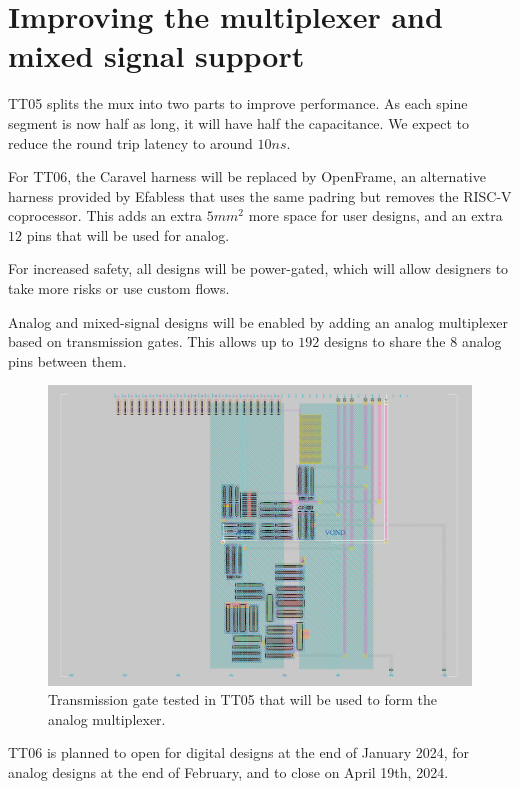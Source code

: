 \section{Improving the multiplexer and mixed signal support}
\label{sec:improving}

TT05 splits the mux into two parts to improve performance.
As each spine segment is now half as long, it will have half the capacitance.
We expect to reduce the round trip latency to around \(10 ns\).

For TT06, the Caravel harness will be replaced by OpenFrame\cite{openframe}, an alternative harness provided by Efabless that uses the same padring but removes the RISC-V coprocessor.
This adds an extra \(5 mm^2\) more space for user designs, and an extra \(12\) pins that will be used for analog.

For increased safety, all designs will be power-gated, which will allow designers to take more risks or use custom flows.

Analog and mixed-signal designs will be enabled by adding an analog multiplexer based on transmission gates\cite{transmissiongates}.
This allows up to \(192\) designs to share the \(8\) analog pins between them.

\begin{figure}[htp]
\centering
\includegraphics[width=\columnwidth]{./Figs/tt05_transmission_gate.png}
\caption{Transmission gate tested in TT05 that will be used to form the analog multiplexer.}
\label{fig:transmission_gate_TT05}
\end{figure}

TT06 is planned to open for digital designs at the end of January 2024, for analog designs at the end of February, and to close on April 19th, 2024.

